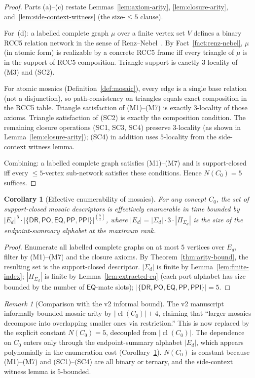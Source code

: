 \documentclass[11pt]{article}
\newtheorem{corollary}[theorem]{Corollary}
\theoremstyle{definition}
\theoremstyle{remark}
\newtheorem{remark}[theorem]{Remark}
\newcommand{\DR}{\mathsf{DR}}
\newcommand{\PO}{\mathsf{PO}}
\newcommand{\PP}{\mathsf{PP}}
\newcommand{\PPI}{\mathsf{PPI}}
\newcommand{\EQ}{\mathsf{EQ}}
\newcommand{\Base}{\{\DR,\PO,\EQ,\PP,\PPI\}}
\newcommand{\cl}{\operatorname{cl}}
\begin{document}
\begin{proof}
Parts (a)--(c) restate Lemmas~\ref{lem:axiom-arity},
\ref{lem:closure-arity}, and~\ref{lem:side-context-witness} (the
size-$\le 5$ clause).

For~(d): a labelled complete graph $\mu$ over a finite vertex set
$V$ defines a binary RCC5 relation network in the sense of
Renz--Nebel~\cite{RenzNebel}.  By
Fact~\ref{fact:renz-nebel}, $\mu$ (in atomic form) is realizable by
a concrete RCC5 frame iff every triangle of $\mu$ is in the support
of RCC5 composition.  Triangle support is exactly $3$-locality of
(M3) and (SC2).

For atomic mosaics (Definition~\ref{def:mosaic}), every edge is a
single base relation (not a disjunction), so path-consistency on
triangles equals exact composition in the RCC5 table.  Triangle
satisfaction of (M1)--(M7) is exactly $3$-locality of those axioms.
Triangle satisfaction of (SC2) is exactly the composition condition.
The remaining closure operations (SC1, SC3, SC4) preserve
$3$-locality (as shown in Lemma~\ref{lem:closure-arity}); (SC4) in
addition uses $5$-locality from the side-context witness lemma.

Combining: a labelled complete graph satisfies (M1)--(M7) and is
support-closed iff every $\le 5$-vertex sub-network satisfies these
conditions.  Hence $N(C_0)=5$ suffices.
\end{proof}

\begin{corollary}[Effective enumerability of mosaics]
\label{cor:effective-mosaics}
For any concept $C_0$, the set of support-closed mosaic descriptors
is effectively enumerable in time bounded by
$|E_d|^{\,5}\cdot|\Base|^{\binom{5}{2}}$, where
$|E_d|=|\Sigma_d|\cdot 3\cdot|\Pi_{\Sigma_d}|$ is the size of the
endpoint-summary alphabet at the maximum rank.
\end{corollary}

\begin{proof}
Enumerate all labelled complete graphs on at most $5$ vertices over
$E_d$, filter by (M1)--(M7) and the closure axioms.  By
Theorem~\ref{thm:arity-bound}, the resulting set is the
support-closed descriptor.  $|\Sigma_d|$ is finite by
Lemma~\ref{lem:finite-index}; $|\Pi_{\Sigma_d}|$ is finite by
Lemma~\ref{lem:extracted-eq} (each port alphabet has size bounded by
the number of $\EQ$-mate slots); $|\Base|=5$.\end{proof}

\begin{remark}[Comparison with the v2 informal bound]
\label{rem:vs-v2-informal}
The v2 manuscript informally bounded mosaic arity by
$|\cl(C_0)|+4$, claiming that ``larger mosaics decompose into
overlapping smaller ones via restriction.''  This is now replaced
by the explicit constant $N(C_0)=5$, decoupled from
$|\cl(C_0)|$.  The dependence on $C_0$ enters only through the
endpoint-summary alphabet $|E_d|$, which appears polynomially in
the enumeration cost (Corollary~\ref{cor:effective-mosaics}).
$N(C_0)$ is constant because (M1)--(M7) and (SC1)--(SC4) are all
binary or ternary, and the side-context witness lemma is
$5$-bounded.
\end{remark}
\end{document}
